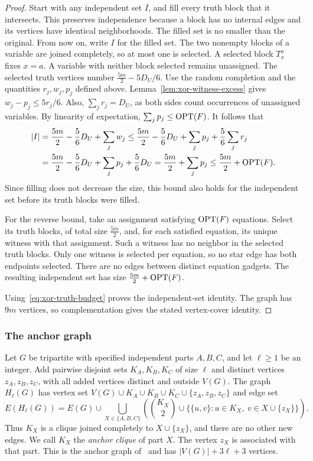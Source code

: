 \begin{proof}
Start with any independent set $I$, and fill every truth block that
it intersects. This preserves independence because a block has no internal
edges and its vertices have identical neighborhoods. The filled set
is no smaller than the original. From now on, write $I$ for the filled set. The
two nonempty blocks of a variable are joined completely, so at most one is selected.
A selected block $T_x^a$ fixes $x=a$. A variable with neither block
selected remains unassigned.
The selected truth vertices number $\frac{5m}{2}-5D_U/6$. Use the random
completion and the quantities $r_j,w_j,p_j$ defined above.
Lemma~\ref{lem:xor-witness-excess} gives $w_j-p_j\le5r_j/6$. Also, $\sum_jr_j=D_U$,
as both sides count occurrences of unassigned variables. By linearity
of expectation, $\sum_jp_j\le\operatorname{OPT}(F)$. It follows that
\[
\begin{aligned}
 |I|&=\frac{5m}{2}-\frac56D_U+\sum_jw_j
 \le\frac{5m}{2}-\frac56D_U+\sum_jp_j+\frac56\sum_jr_j\\
 &=\frac{5m}{2}-\frac56D_U+\sum_jp_j+\frac56D_U
 =\frac{5m}{2}+\sum_jp_j\le\frac{5m}{2}+\operatorname{OPT}(F).
\end{aligned}
\]
Since filling does not decrease the size, this bound also holds for
the independent set before its truth blocks were filled.

For the reverse bound, take an assignment satisfying $\operatorname{OPT}(F)$
equations. Select its truth blocks, of total size $\frac{5m}{2}$, and, for each
satisfied equation, its unique witness with that assignment. Such a
witness has no neighbor in the selected truth blocks. Only one witness
is selected per equation, so no star edge has both endpoints selected.
There are no edges between distinct equation gadgets. The resulting
independent set has size $\frac{5m}{2}+\operatorname{OPT}(F)$.

Using~\eqref{eq:xor-truth-budget} proves the independent-set identity.
The graph has $9m$ vertices, so complementation gives the stated
vertex-cover identity.
\end{proof}

\subsubsection{The anchor graph}
\label{subsubsec:anchor-graph}

Let $G$ be tripartite with specified independent parts $A,B,C$, and
let $\ell\ge1$ be an integer. Add pairwise disjoint sets
$K_A,K_B,K_C$ of size $\ell$ and distinct vertices $z_A,z_B,z_C$,
with all added vertices distinct and outside $V(G)$.
The graph $H_\ell(G)$ has vertex set
$V(G)\cup K_A\cup K_B\cup K_C\cup\{z_A,z_B,z_C\}$ and edge set
\[
 E(H_\ell(G))=E(G)\cup
 \bigcup_{X\in\{A,B,C\}}
 \left(\binom{K_X}{2}\cup
       \{\{u,v\}:u\in K_X,\ v\in X\cup\{z_X\}\}\right).
\]
Thus $K_X$ is a clique joined completely to $X\cup\{z_X\}$, and
there are no other new edges. We call $K_X$ the \emph{anchor clique}
of part $X$. The vertex $z_X$ is associated with that part. This is
the anchor graph of~\cite[Lemma~6]{BNS} and has $|V(G)|+3\ell+3$ vertices.

